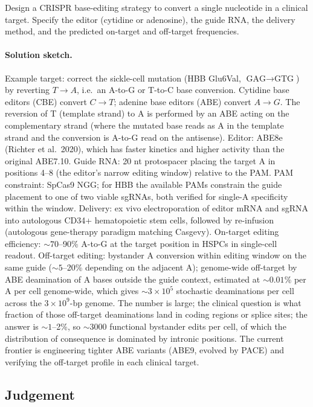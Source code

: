 \begin{exercise}
Design a CRISPR base-editing strategy to convert a single
nucleotide in a clinical target. Specify the editor (cytidine or
adenosine), the guide RNA, the delivery method, and the predicted
on-target and off-target frequencies.

\paragraph{Solution sketch.}
Example target: correct the sickle-cell mutation (HBB Glu6Val,
$\text{GAG} \to \text{GTG}$) by reverting $T \to A$, i.e.\ an
A-to-G or T-to-C base conversion. Cytidine base editors (CBE)
convert $C \to T$; adenine base editors (ABE) convert $A \to G$.
The reversion of T (template strand) to A is performed by an ABE
acting on the complementary strand (where the mutated base reads
as A in the template strand and the conversion is A-to-G read on
the antisense). Editor: ABE8e (Richter et al.\ 2020), which has
faster kinetics and higher activity than the original ABE7.10.
Guide RNA: 20 nt protospacer placing the target A in positions
4--8 (the editor's narrow editing window) relative to the PAM. PAM
constraint: SpCas9 NGG; for HBB the available PAMs constrain the
guide placement to one of two viable sgRNAs, both verified for
single-A specificity within the window. Delivery: ex vivo electroporation
of editor mRNA and sgRNA into autologous CD34+ hematopoietic stem
cells, followed by re-infusion (autologous gene-therapy paradigm
matching Casgevy). On-target editing efficiency: $\sim 70$--90\%
A-to-G at the target position in HSPCs in single-cell readout.
Off-target editing: bystander A conversion within editing window
on the same guide ($\sim 5$--20\% depending on the adjacent A);
genome-wide off-target by ABE deamination of A bases outside the
guide context, estimated at $\sim 0.01$\% per A per cell genome-wide,
which gives $\sim 3 \times 10^{5}$ stochastic deaminations per cell
across the $3 \times 10^{9}$-bp genome. The number is large; the
clinical question is what fraction of those off-target deaminations
land in coding regions or splice sites; the answer is $\sim 1$--2\%,
so $\sim 3000$ functional bystander edits per cell, of which the
distribution of consequence is dominated by intronic positions.
The current frontier is engineering tighter ABE variants
(ABE9, evolved by PACE) and verifying the off-target profile in
each clinical target.
\end{exercise}

\subsection*{Judgement}

